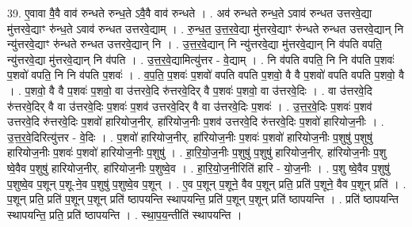 \documentclass[17pt]{extarticle}
\begin{document}
39. ए॒वावा वै॒वै वाव॑ रुन्धते रुन्ध॒ते ऽवै॒वै वाव॑ रुन्धते । . अव॑ रुन्धते रुन्ध॒ते ऽवाव॑ रुन्धत उत्तरवे॒द्या मु॑त्तरवे॒द्याꣳ रु॑न्ध॒ते ऽवाव॑ रुन्धत उत्तरवे॒द्याम् । . रु॒न्ध॒त॒ उ॒त्त॒र॒वे॒द्या मु॑त्तरवे॒द्याꣳ रु॑न्धते रुन्धत उत्तरवे॒द्यान् नि न्यु॑त्तरवे॒द्याꣳ रु॑न्धते रुन्धत उत्तरवे॒द्यान् नि । . उ॒त्त॒र॒वे॒द्यान् नि न्यु॑त्तरवे॒द्या मु॑त्तरवे॒द्यान् नि व॑पति वपति॒ न्यु॑त्तरवे॒द्या मु॑त्तरवे॒द्यान् नि व॑पति । . उ॒त्त॒र॒वे॒द्यामित्यु॑त्तर - वे॒द्याम् । . नि व॑पति वपति॒ नि नि व॑पति प॒शवः॑ प॒शवो॑ वपति॒ नि नि व॑पति प॒शवः॑ । . व॒प॒ति॒ प॒शवः॑ प॒शवो॑ वपति वपति प॒शवो॒ वै वै प॒शवो॑ वपति वपति प॒शवो॒ वै । . प॒शवो॒ वै वै प॒शवः॑ प॒शवो॒ वा उ॑त्तरवे॒दि रु॑त्तरवे॒दिर् वै प॒शवः॑ प॒शवो॒ वा उ॑त्तरवे॒दिः । . वा उ॑त्तरवे॒दि रु॑त्तरवे॒दिर् वै वा उ॑त्तरवे॒दिः प॒शवः॑ प॒शव॑ उत्तरवे॒दिर् वै वा उ॑त्तरवे॒दिः प॒शवः॑ । . उ॒त्त॒र॒वे॒दिः प॒शवः॑ प॒शव॑ उत्तरवे॒दि रु॑त्तरवे॒दिः प॒शवो॑ हारियोज॒नीर्. हा॑रियोज॒नीः प॒शव॑ उत्तरवे॒दि रु॑त्तरवे॒दिः प॒शवो॑ हारियोज॒नीः । . उ॒त्त॒र॒वे॒दिरित्यु॑त्तर - वे॒दिः । . प॒शवो॑ हारियोज॒नीर्. हा॑रियोज॒नीः प॒शवः॑ प॒शवो॑ हारियोज॒नीः प॒शुषु॑ प॒शुषु॑ हारियोज॒नीः प॒शवः॑ प॒शवो॑ हारियोज॒नीः प॒शुषु॑ । . हा॒रि॒यो॒ज॒नीः प॒शुषु॑ प॒शुषु॑ हारियोज॒नीर्. हा॑रियोज॒नीः प॒शु ष्वे॒वैव प॒शुषु॑ हारियोज॒नीर्. हा॑रियोज॒नीः प॒शुष्वे॒व । . हा॒रि॒यो॒ज॒नीरिति॑ हारि - यो॒ज॒नीः । . प॒शु ष्वे॒वैव प॒शुषु॑ प॒शुष्वे॒व प॒शून् प॒शू-ने॒व प॒शुषु॑ प॒शुष्वे॒व प॒शून् । . ए॒व प॒शून् प॒शूने॒ वैव प॒शून् प्रति॒ प्रति॑ प॒शूने॒ वैव प॒शून् प्रति॑ । . प॒शून् प्रति॒ प्रति॑ प॒शून् प॒शून् प्रति॑ ष्ठापयन्ति स्थापयन्ति॒ प्रति॑ प॒शून् प॒शून् प्रति॑ ष्ठापयन्ति । . प्रति॑ ष्ठापयन्ति स्थापयन्ति॒ प्रति॒ प्रति॑ ष्ठापयन्ति । . स्था॒प॒य॒न्तीति॑ स्थापयन्ति । \newline
\pagebreak
{}
\end{document}
